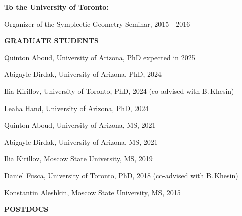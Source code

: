 \documentclass[a4paper, 12pt]{article}
\begin{document}
 \par\smallskip
\textbf{To the University of Toronto:}
\begin{compactitem}
\item Organizer of the {Symplectic Geometry Seminar}, 2015 - 2016
\end{compactitem}
\par\quad\par\smallskip
\textbf{GRADUATE STUDENTS} \par\smallskip
\begin{compactitem}
\item  Quinton Aboud, University of Arizona, PhD expected in 2025
\item Abigayle Dirdak, University of Arizona, PhD, 2024
\item Ilia Kirillov, University of Toronto, PhD, 2024 (co-advised with B.\,Khesin)
\item  Leaha Hand, University of Arizona, PhD, 2024
\item  Quinton Aboud, University of Arizona, MS, 2021
\item Abigayle Dirdak, University of Arizona, MS, 2021
\item Ilia Kirillov, Moscow State University, MS, 2019
\item Daniel Fusca, University of Toronto, PhD, 2018 (co-advised with B.\,Khesin)
\item Konstantin Aleshkin, Moscow State University, MS, 2015



\end{compactitem}
\par\quad\par
\textbf{POSTDOCS} \par\smallskip
\end{document}
